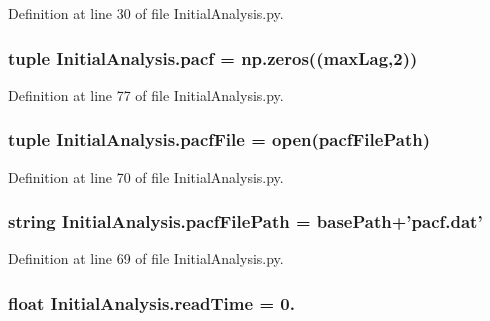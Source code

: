 Definition at line 30 of file Initial\-Analysis.\-py.

\hypertarget{namespace_initial_analysis_a23fa87d68ed30a85f09941a0e5fb2fb1}{
\subsubsection[{pacf}]{\setlength{\rightskip}{0pt plus 5cm}tuple Initial\-Analysis.\-pacf = np.\-zeros(({\bf max\-Lag},2))}}\label{namespace_initial_analysis_a23fa87d68ed30a85f09941a0e5fb2fb1}


Definition at line 77 of file Initial\-Analysis.\-py.

\hypertarget{namespace_initial_analysis_a0b2e4511acd1a69080718a129a84637a}{
\subsubsection[{pacf\-File}]{\setlength{\rightskip}{0pt plus 5cm}tuple Initial\-Analysis.\-pacf\-File = open({\bf pacf\-File\-Path})}}\label{namespace_initial_analysis_a0b2e4511acd1a69080718a129a84637a}


Definition at line 70 of file Initial\-Analysis.\-py.

\hypertarget{namespace_initial_analysis_ac8cf076709e57b76c8ac1d19775b1aa3}{
\subsubsection[{pacf\-File\-Path}]{\setlength{\rightskip}{0pt plus 5cm}string Initial\-Analysis.\-pacf\-File\-Path = {\bf base\-Path}+'pacf.\-dat'}}\label{namespace_initial_analysis_ac8cf076709e57b76c8ac1d19775b1aa3}


Definition at line 69 of file Initial\-Analysis.\-py.

\hypertarget{namespace_initial_analysis_a03a376434b7fa787e1ba016b5534e816}{
\subsubsection[{read\-Time}]{\setlength{\rightskip}{0pt plus 5cm}float Initial\-Analysis.\-read\-Time = 0.}}\label{namespace_initial_analysis_a03a376434b7fa787e1ba016b5534e816}


